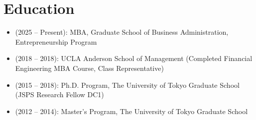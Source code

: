 \documentclass[uplatex,a4j,10.5pt,dvipdfmx]{jsarticle}
\begin{document}
\section{Education}
\begin{itemize}
	\item (2025 -- Present): MBA, Graduate School of Business Administration, Entrepreneurship Program
	\item (2018 -- 2018): UCLA Anderson School of Management (Completed Financial Engineering MBA Course, Class Representative)
	\item (2015 -- 2018): Ph.D. Program, The University of Tokyo Graduate School (JSPS Research Fellow DC1)
	\item (2012 -- 2014): Master's Program, The University of Tokyo Graduate School
\end{itemize}
\end{document}
